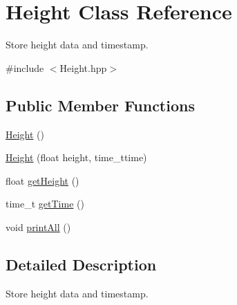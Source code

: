 \hypertarget{classHeight}{\section{Height Class Reference}
\label{classHeight}
}


Store height data and timestamp.  




{\ttfamily \#include $<$Height.\+hpp$>$}

\subsection*{Public Member Functions}
\begin{DoxyCompactItemize}
\item 
\hyperlink{classHeight_a7fecf5018a116f8234513b222bae6a2f}{Height} ()
\item 
\hyperlink{classHeight_a1e48b1093e67413d817eae7acf1064ad}{Height} (float height, time\+\_\+ttime)
\item 
float \hyperlink{classHeight_a595e201f356217323516c6465f697ca4}{get\+Height} ()
\item 
time\+\_\+t \hyperlink{classHeight_a40db46d3736f83f914a59050abfca92d}{get\+Time} ()
\item 
void \hyperlink{classHeight_afa56baac0be90a36def98b7a5a40788f}{print\+All} ()
\end{DoxyCompactItemize}


\subsection{Detailed Description}
Store height data and timestamp. 




